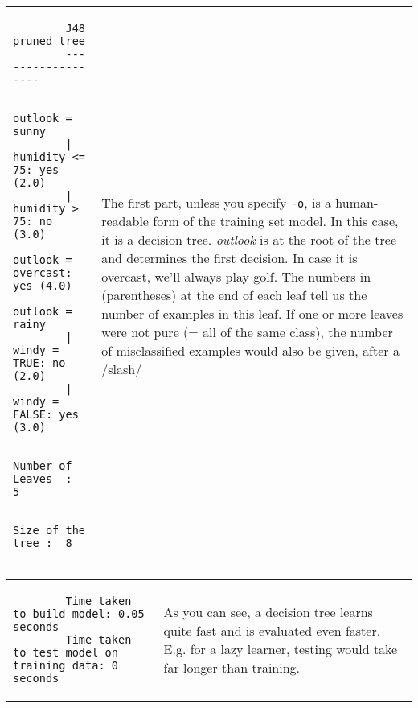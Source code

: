 \vspace{0.5cm}
\noindent
\begin{tabular}{l l}
	\begin{minipage}{7cm}
		{\scriptsize
		\begin{verbatim}
		J48 pruned tree
		------------------
		
		outlook = sunny
		|   humidity <= 75: yes (2.0)
		|   humidity > 75: no (3.0)
		outlook = overcast: yes (4.0)
		outlook = rainy
		|   windy = TRUE: no (2.0)
		|   windy = FALSE: yes (3.0)
		
		Number of Leaves  :  5
		
		Size of the tree :  8
		\end{verbatim}}
	\end{minipage}
	&
	\begin{minipage}{5cm}
	The first part, unless you specify \texttt{-o}, is a human-readable form of the training set model. In this case, it is a decision tree. \textit{outlook} is at the root of the tree and determines the first decision. In case it is overcast, we'll always play golf. The numbers in (parentheses) at the end of each leaf tell us the number of examples in this leaf. If one or more leaves were not pure (= all of the same class), the number of misclassified examples would also be given, after a /slash/
	\end{minipage}
	\\
\end{tabular}

\vspace{0.5cm}
\noindent
\begin{tabular}{l l}
	\begin{minipage}{7cm}
		{\scriptsize
		\begin{verbatim}
		Time taken to build model: 0.05 seconds
		Time taken to test model on training data: 0 seconds
		\end{verbatim}}
	\end{minipage}
	&
	\begin{minipage}{5cm}
	As you can see, a decision tree learns quite fast and is evaluated even faster. E.g. for a lazy learner, testing would take far longer than training.
	\end{minipage}
	\\
\end{tabular}

